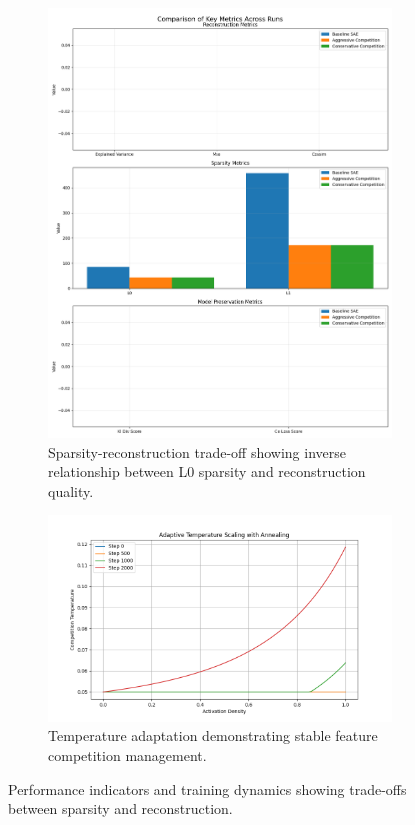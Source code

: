 \documentclass{article} %
\begin{document}
\begin{figure}[h]
    \centering
    \begin{subfigure}{0.49\textwidth}
        \includegraphics[width=\textwidth]{metrics_comparison.png}
        \caption{Sparsity-reconstruction trade-off showing inverse relationship between L0 sparsity and reconstruction quality.}
        \label{fig:metrics}
    \end{subfigure}
    \hfill
    \begin{subfigure}{0.49\textwidth}
        \includegraphics[width=\textwidth]{temperature_scaling.png}
        \caption{Temperature adaptation demonstrating stable feature competition management.}
        \label{fig:temperature}
    \end{subfigure}
    \caption{Performance indicators and training dynamics showing trade-offs between sparsity and reconstruction.}
    \label{fig:results}
\end{figure}
\end{document}
